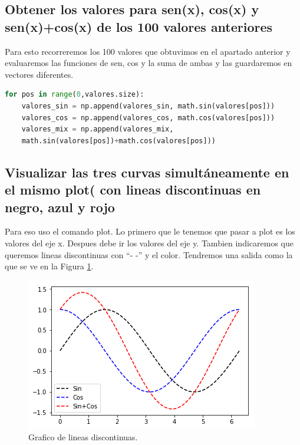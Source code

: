 \documentclass[12pt,a4paper]{article}
\begin{document}
\subsection{Obtener los valores para sen(x), cos(x) y sen(x)+cos(x) de los 100 valores anteriores}
Para esto recorreremos los 100 valores que obtuvimos en el apartado anterior y evaluaremos las funciones de sen, cos y la suma  de ambas y las guardaremos en vectores diferentes.
\begin{lstlisting}[language=Python]
for pos in range(0,valores.size):
    valores_sin = np.append(valores_sin, math.sin(valores[pos])) 
    valores_cos = np.append(valores_cos, math.cos(valores[pos])) 
    valores_mix = np.append(valores_mix, 
    math.sin(valores[pos])+math.cos(valores[pos]))\end{lstlisting}
\subsection{Visualizar las tres curvas simultáneamente en el mismo plot( con lineas discontinuas en negro, azul y rojo}
Para eso uso el comando plot. Lo primero que le tenemos que pasar a plot es los valores del eje x. Despues debe ir los valores del eje y. Tambien indicaremos que queremos lineas discontinuas con ``- -'' y el color.
Tendremos una salida como la que se ve en la Figura \ref{figura2}.

\begin{figure}[H]  %
\centering
\includegraphics{images/graficaLineas.png}  %
\caption{Grafico de lineas discontinuas.}
\label{figura2}
 
\end{figure}
\end{document}
